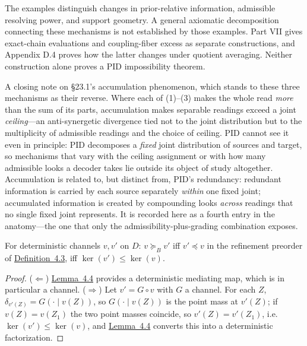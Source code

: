 The examples distinguish changes in prior-relative information, admissible resolving power, and support geometry. A general axiomatic decomposition connecting these mechanisms is not established by those examples. Part VII gives exact-chain evaluations and coupling-fiber excess as separate constructions, and Appendix D.4 proves how the latter changes under quotient averaging. Neither construction alone proves a PID impossibility theorem.

A closing note on §23.1's accumulation phenomenon, which stands to these three mechanisms as their reverse. Where each of (1)--(3) makes the whole read \emph{more} than the sum of its parts, accumulation makes separable readings exceed a joint \emph{ceiling}---\hspace{0pt}an anti-synergetic divergence tied not to the joint distribution but to the multiplicity of admissible readings and the choice of ceiling. PID cannot see it even in principle: PID decomposes a \emph{fixed} joint distribution of sources and target, so mechanisms that vary with the ceiling assignment or with how many admissible looks a decoder takes lie outside its object of study altogether. Accumulation is related to, but distinct from, PID's redundancy: redundant information is carried by each source separately \emph{within} one fixed joint; accumulated information is created by compounding looks \emph{across} readings that no single fixed joint represents. It is recorded here as a fourth entry in the anatomy---\hspace{0pt}the one that only the admissibility-plus-grading combination exposes.



\begin{thmplain}

For deterministic channels \(v, v'\) on \(D\): \(v \succeq_B v'\) iff \(v' \preceq v\) in the refinement preorder of \hyperlink{stmt:4.3}{Definition~4.3}, iff \(\ker(v') \le \ker(v)\).
\end{thmplain}

\begin{proof}

(\(\Leftarrow\)) \hyperlink{stmt:4.4}{Lemma~4.4} provides a deterministic mediating map, which is in particular a channel. (\(\Rightarrow\)) Let \(v' = G \circ v\) with \(G\) a channel. For each \(Z\), \(\delta_{v'(Z)} = G(\cdot \mid v(Z))\), so \(G(\cdot \mid v(Z))\) is the point mass at \(v'(Z)\); if \(v(Z) = v(Z_1)\) the two point masses coincide, so \(v'(Z) = v'(Z_1)\), i.e.~\(\ker(v') \le \ker(v)\), and \hyperlink{stmt:4.4}{Lemma~4.4} converts this into a deterministic factorization.
\end{proof}

